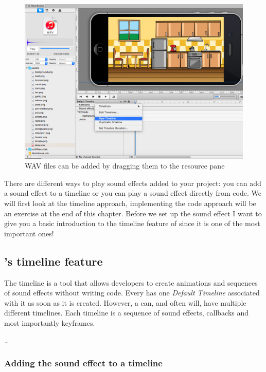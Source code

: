 \begin{figure}[H]
		\centering
		\includegraphics[width=0.9\linewidth]{images/Chapter2/new_timeline_audio.png}
		\caption{WAV files can be added by dragging them to the resource
		pane}\label{fig:audio_new_timeline}
\end{figure}

There are different ways to play sound effects added to your \SB{} project: you
can add a sound effect to a \SB{} timeline or you can play a sound effect
directly from code. We will first look at the timeline approach, implementing the code
approach will be an exercise at the end of this chapter. Before we set up the
sound effect I want to give you a basic introduction to the timeline feature
of \SB{} since it is one of the most important ones!

\subsection{\SB{}'s timeline feature}
The \SB{} timeline is a tool that allows developers to create animations and
sequences of sound effects without writing code. Every \ccbfile{} has one
\textit{Default Timeline} associated with it as soon as it is created. However,
a \ccbfile{} can, and often will, have multiple different timelines. Each
timeline is a sequence of sound effects, callbacks and most importantly
keyframes.

\ldots


\subsubsection{Adding the sound effect to a timeline}

